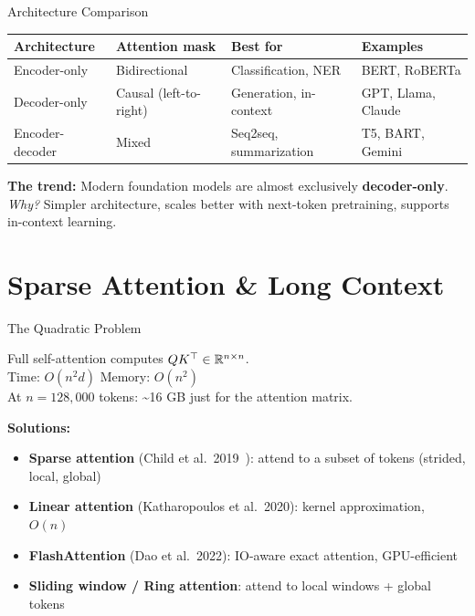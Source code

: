 \documentclass[aspectratio=169,10pt]{beamer}
\begin{document}
\begin{frame}{Architecture Comparison}
  \begin{center}
  \begin{tabular}{llll}
    \toprule
    \textbf{Architecture} & \textbf{Attention mask} & \textbf{Best for} & \textbf{Examples} \\
    \midrule
    Encoder-only & Bidirectional & Classification, NER & BERT, RoBERTa \\
    Decoder-only & Causal (left-to-right) & Generation, in-context & GPT, Llama, Claude \\
    Encoder-decoder & Mixed & Seq2seq, summarization & T5, BART, Gemini \\
    \bottomrule
  \end{tabular}
  \end{center}
  \vspace{0.5em}
  \textbf{The trend:} Modern foundation models are almost exclusively \textbf{decoder-only}.\\
  \emph{Why?} Simpler architecture, scales better with next-token pretraining, supports in-context learning.
\end{frame}

\section{Sparse Attention \& Long Context}

\begin{frame}{The Quadratic Problem}
  \begin{tcolorbox}[alertbox, title=Computational Bottleneck]
    Full self-attention computes $QK^{\top} \in \mathbb{R}^{n \times n}$. \\
    Time: $O(n^2 d)$ \quad Memory: $O(n^2)$ \\
    At $n = 128{,}000$ tokens: \textasciitilde 16 GB just for the attention matrix.
  \end{tcolorbox}
  \vspace{0.5em}
  \textbf{Solutions:}
  \begin{itemize}
    \item \textbf{Sparse attention} (Child et al.\ 2019~\cite{child2019sparsetransformer}): attend to a subset of tokens (strided, local, global)
    \item \textbf{Linear attention} (Katharopoulos et al.\ 2020): kernel approximation, $O(n)$
    \item \textbf{FlashAttention} (Dao et al.\ 2022): IO-aware exact attention, GPU-efficient
    \item \textbf{Sliding window / Ring attention}: attend to local windows + global tokens
  \end{itemize}
\end{frame}
\end{document}
